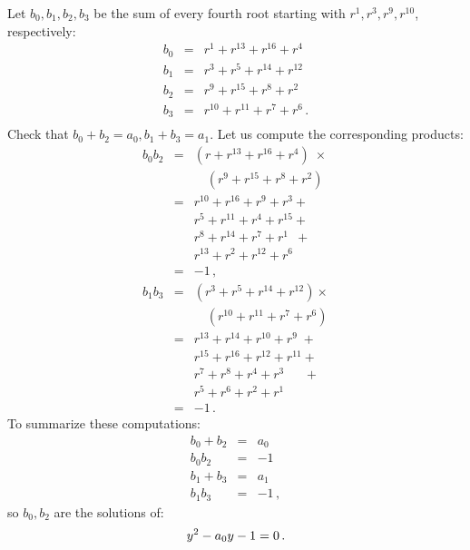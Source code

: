 \documentclass[11pt,a4paper]{article}
\newenvironment{form}[1]{%
\begin{displaymath}%
\renewcommand{\arraystretch}{#1}%
\begin{array}{lcl}}%
{\end{array}%
\end{displaymath}%
}
\begin{document}
Let $b_0,b_1,b_2,b_3$ be the sum of every fourth root starting with $r^1,r^3,r^9,r^{10}$, respectively:
\begin{form}{1.3}
b_0&=& r^1+ r^{13} + r^{16} + r^4\\
b_1&=& r^3+ r^{5} + r^{14} + r^{12}\\
b_2&=& r^9+ r^{15} + r^{8} + r^2\\
b_3&=& r^{10}+ r^{11} + r^{7} + r^6\,.\\
\end{form}
Check that $b_0+b_2=a_0, b_1+b_3=a_1$. Let us compute the corresponding products:%
\begin{form}{1.3}
b_0b_2&=&(r + r^{13} + r^{16} +r^4)\;\times\\
&&\quad (r^9 + r^{15} + r^{8} +r^{2})\\
&=& r^{10}+r^{16}+r^9+r^3+\\
&& r^{5}+r^{11}+r^4+r^{15}+\\
&& r^{8}+r^{14}+r^7+r^1\;\:+\\
&& r^{13}+r^{2}+r^{12}+r^6\\
&=&-1\,,\\
b_1b_3&=&(r^3 + r^{5} + r^{14} +r^{12})\times\\
&&\quad (r^{10} + r^{11} + r^{7} +r^{6})\\
&=& r^{13}+r^{14}+r^{10}+r^9\;+\\
&& r^{15}+r^{16}+r^{12}+r^{11}+\\
&& r^{7}+r^{8}+r^4+r^3\quad\;\;+\\
&& r^{5}+r^{6}+r^{2}+r^1\\
&=&-1\,.
\end{form}
To summarize these computations:
\begin{form}{1.2}
b_0+b_2&=&a_0\\
b_0b_2&=&-1\\
b_1+b_3&=&a_1\\
b_1b_3&=&-1\,,
\end{form}
so $b_0,b_2$ are the solutions of:
\[
y^2-a_0y-1= 0\,.\\
\]
\end{document}
